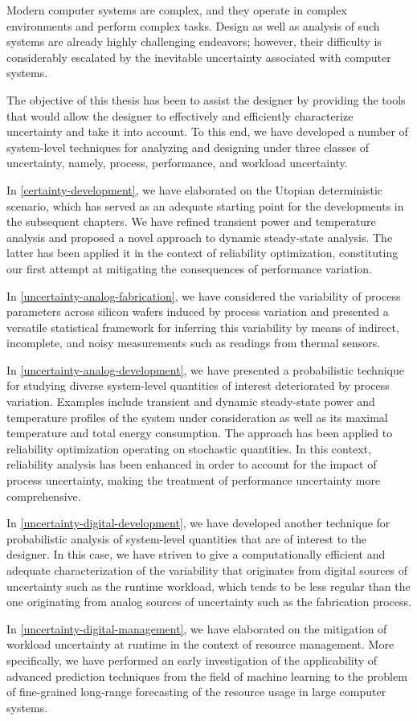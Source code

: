 Modern computer systems are complex, and they operate in complex environments
and perform complex tasks. Design as well as analysis of such systems are
already highly challenging endeavors; however, their difficulty is considerably
escalated by the inevitable uncertainty associated with computer systems.

The objective of this thesis has been to assist the designer by providing the
tools that would allow the designer to effectively and efficiently characterize
uncertainty and take it into account. To this end, we have developed a number of
system-level techniques for analyzing and designing under three classes of
uncertainty, namely, process, performance, and workload uncertainty.

In \cref{certainty-development}, we have elaborated on the Utopian deterministic
scenario, which has served as an adequate starting point for the developments in
the subsequent chapters. We have refined transient power and temperature
analysis and proposed a novel approach to dynamic steady-state analysis. The
latter has been applied it in the context of reliability optimization,
constituting our first attempt at mitigating the consequences of performance
variation.

In \cref{uncertainty-analog-fabrication}, we have considered the variability of
process parameters across silicon wafers induced by process variation and
presented a versatile statistical framework for inferring this variability by
means of indirect, incomplete, and noisy measurements such as readings from
thermal sensors.

In \cref{uncertainty-analog-development}, we have presented a probabilistic
technique for studying diverse system-level quantities of interest deteriorated
by process variation. Examples include transient and dynamic steady-state power
and temperature profiles of the system under consideration as well as its
maximal temperature and total energy consumption. The approach has been applied
to reliability optimization operating on stochastic quantities. In this context,
reliability analysis has been enhanced in order to account for the impact of
process uncertainty, making the treatment of performance uncertainty more
comprehensive.

In \cref{uncertainty-digital-development}, we have developed another technique
for probabilistic analysis of system-level quantities that are of interest to
the designer. In this case, we have striven to give a computationally efficient
and adequate characterization of the variability that originates from digital
sources of uncertainty such as the runtime workload, which tends to be less
regular than the one originating from analog sources of uncertainty such as the
fabrication process.

In \cref{uncertainty-digital-management}, we have elaborated on the mitigation
of workload uncertainty at runtime in the context of resource management.
More specifically, we have performed an early investigation of the applicability
of advanced prediction techniques from the field of machine learning to the
problem of fine-grained long-range forecasting of the resource usage in large
computer systems.
